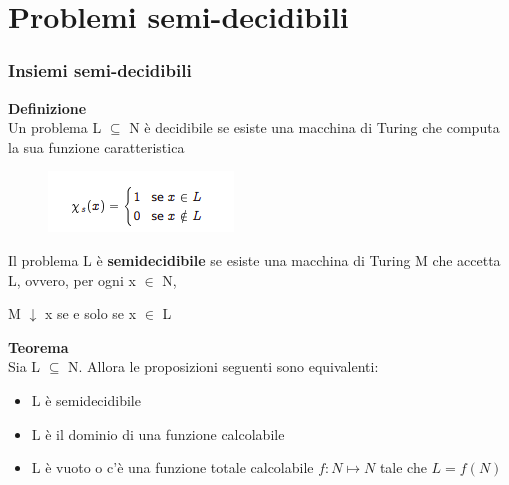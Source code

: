 \chapter{Problemi semi-decidibili} \label{ch:capitolo5}
\subsection{Insiemi semi-decidibili}
\textbf{Definizione}\\
Un problema L $\subseteq$ N è decidibile se esiste una macchina di Turing che computa la sua funzione caratteristica\\
\begin{figure}[htp]
    \centering
    \includegraphics[scale=0.8]{tesi_stile/img/sem1.png}
\end{figure}
Il problema L è \textbf{semidecidibile} se esiste una macchina di Turing M che accetta L, ovvero, per ogni x $\in$ N,
\begin{center}
    M $\downarrow$ x se e solo se x $\in$ L
\end{center}
\textbf{Teorema}\\
Sia L  $\subseteq$ N. Allora le proposizioni seguenti sono equivalenti:
\begin{itemize}
    \item L è semidecidibile
    
    \item L è il dominio di una funzione calcolabile
    
    \item L è vuoto o c’è una funzione totale calcolabile $f : N \mapsto N$ tale che $L = f (N)$
\end{itemize}
\newpage
